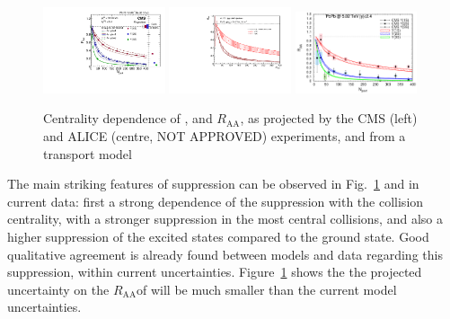 \documentclass[../report.tex]{subfiles}
\providecommand{\raa}{\ensuremath{R_\text{AA}}\Xspace}
\begin{document}

\begin{figure}
\begin{center}
 \includegraphics[width=0.32\textwidth]{quarkonia/fig/cms/CMS-PAS-FTR-17-002_Figure_008-b.pdf}
 \includegraphics[width=0.32\textwidth]{quarkonia/fig/alice/craa_cent}
 \includegraphics[width=0.32\textwidth]{quarkonia/fig/theory/rapp_raa_npart_CMS.png}
\end{center}

 \caption{Centrality dependence of ,  and  \raa, as projected by the CMS\cite{CMS-PAS-FTR-17-002,Krouppa:2016jcl} (left) and ALICE (centre,
 NOT APPROVED) experiments, and from a transport model\cite{Du:2017qkv}}
 \label{fig:upsi_raa_npart}
\end{figure}

% 


The main striking features of \PGU suppression can be observed in Fig.~\ref{fig:upsi_raa_npart} and in current data: first a strong dependence of the suppression with the collision
centrality, with a stronger suppression in the most central collisions, and also a higher suppression of the excited states compared to the ground state. Good qualitative agreement
is already found between models and data regarding this suppression, within current uncertainties. Figure~\ref{fig:upsi_raa_npart} shows the the projected uncertainty on the \raa of  will be much smaller than the current model uncertainties.
\end{document}
